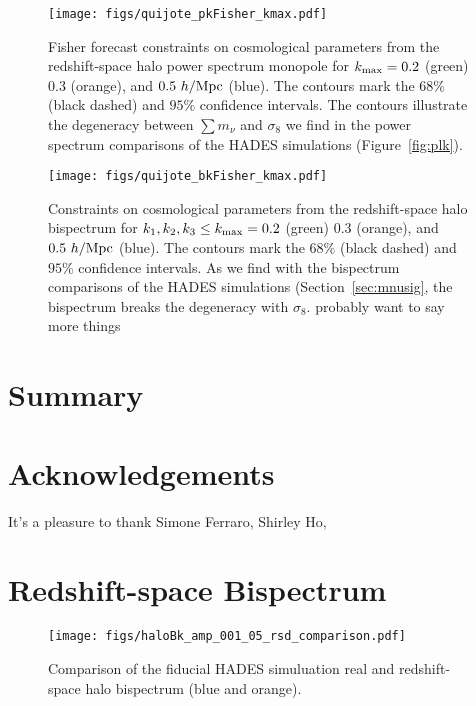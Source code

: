 \documentclass[12pt, letterpaper, preprint]{aastex62}
\newcommand{\smnu}{\sum m_\nu}
\newcommand{\sig}{\sigma_8}
\newcommand{\ch}[1]{{\color{orange}{\bf CH:} #1}}
\begin{document}
\begin{figure}
\begin{center}
    \texttt{[image: figs/quijote\_pkFisher\_kmax.pdf]} 
    \caption{Fisher forecast constraints on cosmological parameters from the 
    redshift-space halo power spectrum monopole for $k_{\rm max} = 0.2$ (green) 0.3 (orange), 
    and $0.5~h/{\rm Mpc}$ (blue). The contours mark the $68\%$ (black dashed) and $95\%$ 
    confidence intervals. The contours illustrate the degeneracy between $\smnu$ and $\sig$ 
    we find  in the power spectrum comparisons of the HADES simulations (Figure~\ref{fig:plk}).}
\label{fig:pk_fish_kmax}
\end{center}
\end{figure}


\begin{figure}
\begin{center}
    \texttt{[image: figs/quijote\_bkFisher\_kmax.pdf]} 
    \caption{Constraints on cosmological parameters from the redshift-space
    halo bispectrum for $k_1, k_2, k_3 \leq k_{\rm max} = 0.2$ (green) 0.3 (orange), 
    and $0.5~h/{\rm Mpc}$ (blue). The contours mark the $68\%$ (black dashed) and $95\%$ 
    confidence intervals. As we find with the bispectrum comparisons of the HADES 
    simulations (Section~\ref{sec:mnusig}, the bispectrum breaks the degeneracy 
    with $\sig$. \ch{probably want to say more things}}
\label{fig:bk_fish_kmax}
\end{center}
\end{figure}

\section{Summary} 


\section*{Acknowledgements}
It's a pleasure to thank 
    Simone Ferraro, 
    Shirley Ho, 

\appendix
\section{Redshift-space Bispectrum} 
\begin{figure}
\begin{center}
    \texttt{[image: figs/haloBk\_amp\_001\_05\_rsd\_comparison.pdf]}
    \caption{Comparison of the fiducial HADES simuluation real and redshift-space halo
    bispectrum (blue and orange).}
\label{fig:cov_converge}
\end{center}
\end{figure}
\end{document}
